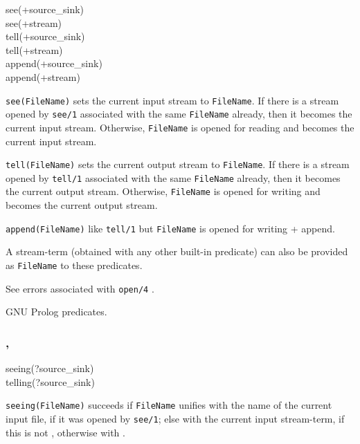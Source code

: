 \begin{TemplatesOneCol}
see(+source\_sink)\\
see(+stream)\\
tell(+source\_sink)\\
tell(+stream)\\
append(+source\_sink)\\
append(+stream)

\end{TemplatesOneCol}

\Description

\texttt{see(FileName)} sets the current input stream to \texttt{FileName}.
If there is a stream opened by \texttt{see/1} associated with the same
\texttt{FileName} already, then it becomes the current input stream.
Otherwise, \texttt{FileName} is opened for reading and becomes the current
input stream.

\texttt{tell(FileName)} sets the current output stream to \texttt{FileName}.
If there is a stream opened by \texttt{tell/1} associated with the same
\texttt{FileName} already, then it becomes the current output stream.
Otherwise, \texttt{FileName} is opened for writing and becomes the current
output stream.

\texttt{append(FileName)} like \texttt{tell/1} but
\texttt{FileName} is opened for writing + append.

A stream-term (obtained with any other built-in predicate) can also be
provided as \texttt{FileName} to these predicates.

\Errors

See errors associated with \texttt{open/4} .

\Portability

GNU Prolog predicates.

\subsubsection{,
               }

\begin{TemplatesOneCol}
seeing(?source\_sink)\\
telling(?source\_sink)

\end{TemplatesOneCol}

\Description

\texttt{seeing(FileName)} succeeds if \texttt{FileName} unifies
with the name of the current input file, if it was opened by
\texttt{see/1}; else with the current input stream-term, if this is not
, otherwise with
.

